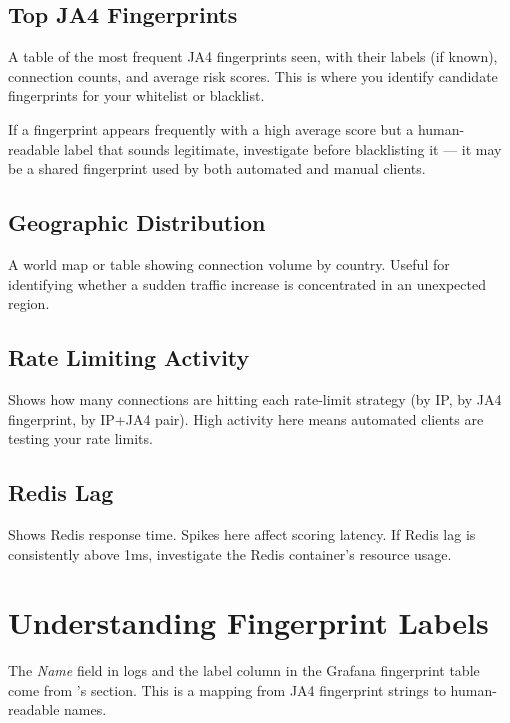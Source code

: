 \subsection{Top JA4 Fingerprints}

A table of the most frequent JA4 fingerprints seen, with their labels (if known),
connection counts, and average risk scores. This is where you identify candidate
fingerprints for your whitelist or blacklist.

If a fingerprint appears frequently with a high average score but a human-readable
label that sounds legitimate, investigate before blacklisting it — it may be a
shared fingerprint used by both automated and manual clients.

\subsection{Geographic Distribution}

A world map or table showing connection volume by country. Useful for identifying
whether a sudden traffic increase is concentrated in an unexpected region.

\subsection{Rate Limiting Activity}

Shows how many connections are hitting each rate-limit strategy (by IP, by JA4
fingerprint, by IP+JA4 pair). High activity here means automated clients are
testing your rate limits.

\subsection{Redis Lag}

Shows Redis response time. Spikes here affect scoring latency. If Redis lag is
consistently above 1ms, investigate the Redis container's resource usage.

\section{Understanding Fingerprint Labels}

The \emph{Name} field in logs and the label column in the Grafana fingerprint table
come from 's  section. This
is a mapping from JA4 fingerprint strings to human-readable names.

